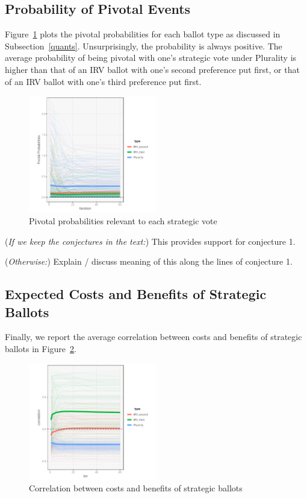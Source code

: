 \documentclass[12pt, letter]{article}
\begin{document}
\subsection{Probability of Pivotal Events}

Figure~\ref{fig:pivot} plots the pivotal probabilities for each ballot type as discussed in Subsection~\ref{quants}. Unsurprisingly, the probability is always positive. The average probability of being pivotal with one's strategic vote under Plurality is higher than that of an IRV ballot with one's second preference put first, or that of an IRV ballot with one's third preference put first.

\begin{figure}[!htb]
	\centering
	\includegraphics[width = 0.5\textwidth]{../output/figures/conj1}
	\caption{Pivotal probabilities relevant to each strategic vote}
	\label{fig:pivot}
\end{figure}

(\emph{If we keep the conjectures in the text:}) This provides support for conjecture 1.

(\emph{Otherwise:}) Explain / discuss meaning of this along the lines of conjecture 1.

\subsection{Expected Costs and Benefits of Strategic Ballots}

Finally, we report the average correlation between costs and benefits of strategic ballots in Figure~\ref{fig:correlation}.

\begin{figure}[!htb]
	\centering
	\includegraphics[width = 0.5\textwidth]{../output/figures/conj2}
	\caption{Correlation between costs and benefits of strategic ballots}
	\label{fig:correlation}
\end{figure}
\end{document}
